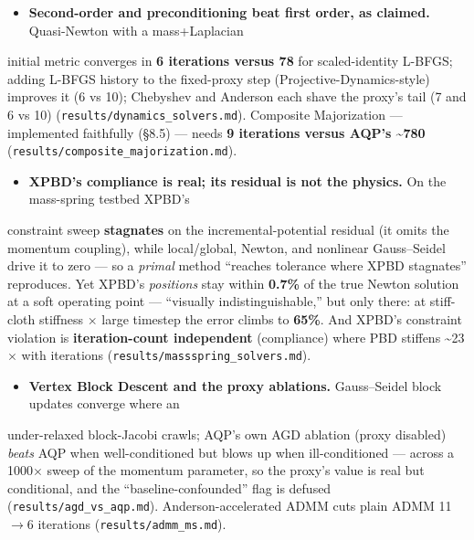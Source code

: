 \documentclass{egpubl}
\begin{document}
\begin{itemize}
  \item \textbf{Second-order and preconditioning beat first order, as claimed.} Quasi-Newton with a mass+Laplacian
\end{itemize}
  initial metric converges in \textbf{6 iterations versus 78} for scaled-identity L-BFGS; adding L-BFGS
  history to the fixed-proxy step (Projective-Dynamics-style) improves it (6 vs 10); Chebyshev and
  Anderson each shave the proxy's tail (7 and 6 vs 10) (\texttt{results/dynamics\_solvers.md}). Composite
  Majorization --- implemented faithfully (\S8.5) --- needs \textbf{9 iterations versus AQP's \textasciitilde{}780}
  (\texttt{results/composite\_majorization.md}).
\begin{itemize}
  \item \textbf{XPBD's compliance is real; its residual is not the physics.} On the mass-spring testbed XPBD's
\end{itemize}
  constraint sweep \textbf{stagnates} on the incremental-potential residual (it omits the momentum coupling),
  while local/global, Newton, and nonlinear Gauss--Seidel drive it to zero --- so a \emph{primal} method
  ``reaches tolerance where XPBD stagnates'' reproduces. Yet XPBD's \emph{positions} stay within \textbf{0.7\%} of the
  true Newton solution at a soft operating point --- ``visually indistinguishable,'' but only there: at
  stiff-cloth stiffness $\times$ large timestep the error climbs to \textbf{65\%}. And XPBD's constraint violation is
  \textbf{iteration-count independent} (compliance) where PBD stiffens \textasciitilde{}23$\times$ with iterations
  (\texttt{results/massspring\_solvers.md}).
\begin{itemize}
  \item \textbf{Vertex Block Descent and the proxy ablations.} Gauss--Seidel block updates converge where an
\end{itemize}
  under-relaxed block-Jacobi crawls; AQP's own AGD ablation (proxy disabled) \emph{beats} AQP when
  well-conditioned but blows up when ill-conditioned --- across a 1000$\times$ sweep of the momentum parameter,
  so the proxy's value is real but conditional, and the ``baseline-confounded'' flag is defused
  (\texttt{results/agd\_vs\_aqp.md}). Anderson-accelerated ADMM cuts plain ADMM 11$\rightarrow$6 iterations
  (\texttt{results/admm\_ms.md}).
\end{document}
